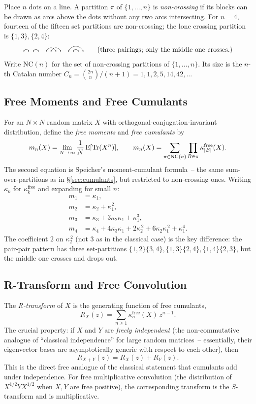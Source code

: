 Place $n$ dots on a line. A partition $\pi$ of $\{1,\dots,n\}$ is \emph{non-crossing} if its blocks can be drawn as arcs above the dots without any two arcs intersecting. For $n=4$, fourteen of the fifteen set partitions are non-crossing; the lone crossing partition is $\{1,3\},\{2,4\}$:
\[
   \arcdiag{4}{\arcc{1}{2}\arcc{3}{4}}
   \quad
   \arcdiag{4}{\arcc{1}{3}\arcc{2}{4}}
   \quad
   \arcdiag{4}{\arcc{1}{4}\arcc{2}{3}}
   \qquad\text{(three pairings; only the middle one crosses.)}
\]
Write $\mathrm{NC}(n)$ for the set of non-crossing partitions of $\{1,\dots,n\}$.
Its size is the $n$-th Catalan number $C_n = \binom{2n}{n}/(n+1) = 1, 1, 2, 5, 14, 42, \dots$

\subsection{Free Moments and Free Cumulants}

For an $N \times N$ random matrix $X$ with orthogonal-conjugation-invariant distribution, define the \emph{free moments} and \emph{free cumulants} by
\[
   m_n(X) = \lim_{N \to \infty} \frac{1}{N}\, \mathrm{E}[\mathrm{Tr}(X^n)],
   \qquad
   m_n(X) = \sum_{\pi \in \mathrm{NC}(n)} \prod_{B \in \pi} \kappa_{|B|}^{\mathrm{free}}(X).
\]
The second equation is Speicher's moment-cumulant formula~-- the same sum-over-partitions as in \S\ref{sec:cumulants}, but restricted to non-crossing ones. Writing $\kappa_k$ for $\kappa_k^{\mathrm{free}}$ and expanding for small $n$:
\begin{align*}
   m_1 &= \kappa_1, \\
   m_2 &= \kappa_2 + \kappa_1^2, \\
   m_3 &= \kappa_3 + 3\kappa_2\kappa_1 + \kappa_1^3, \\
   m_4 &= \kappa_4 + 4\kappa_3\kappa_1 + 2\kappa_2^{\,2} + 6\kappa_2\kappa_1^{\,2} + \kappa_1^4.
\end{align*}
The coefficient $2$ on $\kappa_2^{\,2}$ (not $3$ as in the classical case) is the key difference: the pair-pair pattern has three set-partitions $\{1,2\}\{3,4\},\{1,3\}\{2,4\},\{1,4\}\{2,3\}$, but the middle one crosses and drops out.

\subsection{R-Transform and Free Convolution}

The \emph{R-transform} of $X$ is the generating function of free cumulants,
\[
   R_X(z) = \sum_{n \ge 1} \kappa_n^{\mathrm{free}}(X)\, z^{n-1}.
\]
The crucial property: if $X$ and $Y$ are \emph{freely independent} (the non-commutative analogue of ``classical independence'' for large random matrices~-- essentially, their eigenvector bases are asymptotically generic with respect to each other), then
\[
   R_{X+Y}(z) = R_X(z) + R_Y(z).
\]
This is the direct free analogue of the classical statement that cumulants add under independence. For free multiplicative convolution (the distribution of $X^{1/2} Y X^{1/2}$ when $X, Y$ are free positive), the corresponding transform is the $S$-transform and is multiplicative.

